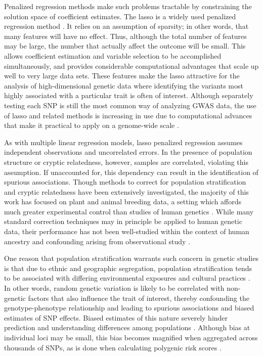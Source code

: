 Penalized regression methods make such problems tractable by constraining the solution space of coefficient estimates. The lasso is a widely used penalized regression method \citep{tibshirani1996regression}.  It relies on an assumption of sparsity; in other words, that many features will have no effect. Thus, although the total number of features may be large, the number that actually affect the outcome will be small. This allows coefficient estimation and variable selection to be accomplished simultaneously, and provides considerable computational advantages that scale up well to very large data sets. These features make the lasso attractive for the analysis of high-dimensional genetic data where identifying the variants most highly associated with a particular trait is often of interest. Although separately testing each SNP is still the most common way of analyzing GWAS data, the use of lasso and related methods is increasing in use due to computational advances that make it practical to apply on a genome-wide scale \citep{qian2020fast, prive2018efficient}. 

As with multiple linear regression models, lasso penalized regression assumes independent observations and uncorrelated errors. In the presence of population structure or cryptic relatedness, however, samples are correlated, violating this assumption. If unaccounted for, this dependency can result in the identification of spurious associations. Though methods to correct for population stratification and cryptic relatedness have been extensively investigated, the majority of this work has focused on plant and animal breeding data, a setting which affords much greater experimental control than studies of human genetics \citep{Amin2007, hoffman2013correcting, price2006principal, rakitsch2013lasso, bhatnagar2020simultaneous, Sillanpaeae2011}. While many standard correction techniques may in principle be applied to human genetic data, their performance has not been well-studied within the context of human ancestry and confounding arising from observational study \citep{lawson2019population, barton2019population}.  

One reason that population stratification warrants such concern in genetic studies is that due to ethnic and geographic segregation, population stratification tends to be associated with differing environmental exposures and cultural practices \citep{thornton2015statistical, browning2011population}. In other words, random genetic variation is likely to be correlated with non-genetic factors that also influence the trait of interest, thereby confounding the genotype-phenotype relationship and leading to spurious associations and biased estimates of SNP effects. Biased estimates of this nature severely hinder prediction and understanding differences among populations \citep{barton2019population}. Although bias at individual loci may be small, this bias becomes magnified when aggregated across thousands of SNPs, as is done when calculating polygenic risk scores \citep{barton2019population, peterson2019genome}.

